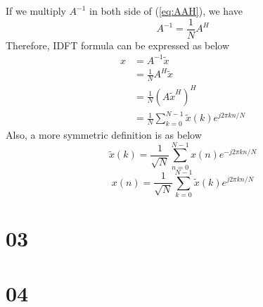 \documentclass{article}
\begin{document}
If we multiply $A^{-1}$ in both side of (\ref{eq:AAH}), we have
\begin{equation}
    A^{-1} = \frac1N A^H
\label{eq:A-1}
\end{equation}
Therefore, IDFT formula can be expressed as below
\begin{equation}
    \begin{aligned}
        x &= A^{-1} \tilde{x}\\ 
        &= \frac1N A^H \tilde{x} \\ 
        &= \frac{1}{N} (A \tilde{x}^H)^H \\ 
        &= \frac{1}{N} \sum^{N - 1}_{k = 0} \tilde{x}(k)e^{j2\pi kn /N}
    \end{aligned}
\end{equation}
Also, a more symmetric definition is as below
$$
    \tilde{x}(k) = \frac{1}{\sqrt{N}} \sum_{n = 0}^{N - 1} x(n) e^{-j 2\pi kn/N}
$$
$$
    x(n) = \frac{1}{\sqrt{N}} \sum_{k = 0}^{N - 1} \tilde{x}(k) e^{j 2\pi kn/N}
$$
\section{03}

\section{04}






\begin{appendices}

\end{appendices}
\end{document}
